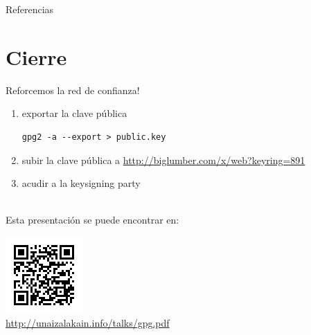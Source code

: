 \documentclass{beamer}
\begin{document}
\begin{frame}[allowframebreaks]{Referencias}
    \nocite{*}
    \printbibliography
\end{frame}


\section{Cierre}
\begin{frame}[fragile]
Reforcemos la red de confianza!
\begin{enumerate}
    \item exportar la clave pública
        \begin{lstlisting}
gpg2 -a --export > public.key
        \end{lstlisting}
    \item subir la clave pública a \url{http://biglumber.com/x/web?keyring=891}
    \item acudir a la keysigning party
\end{enumerate}

\hfill\\

Esta presentación se puede encontrar en:
\begin{center}
    \includegraphics[height=.2\textheight]{qrlink}\\
    \url{http://unaizalakain.info/talks/gpg.pdf}
\end{center}
\end{frame}
\end{document}
